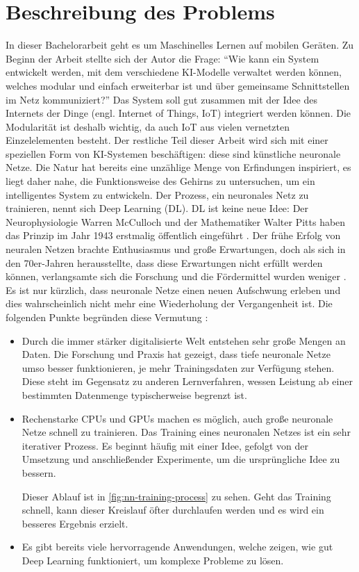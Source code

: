 \section{Beschreibung des Problems}
In dieser Bachelorarbeit geht es um Maschinelles Lernen auf mobilen Geräten.
Zu Beginn der Arbeit stellte sich der Autor die Frage:
\enquote{Wie kann ein System entwickelt werden, mit dem verschiedene KI-Modelle
  verwaltet werden können, welches modular und einfach erweiterbar ist
  und über gemeinsame Schnittstellen im Netz kommuniziert?}
Das System soll gut zusammen mit der Idee des Internets der Dinge
(engl. Internet of Things, IoT) integriert werden können.
Die Modularität ist deshalb wichtig, da auch IoT aus vielen vernetzten
Einzelelementen besteht.
Der restliche Teil dieser Arbeit wird sich mit einer
speziellen Form von KI-Systemen beschäftigen: diese sind künstliche
neuronale Netze. Die Natur hat bereits eine unzählige Menge von Erfindungen
inspiriert, es liegt daher nahe, die Funktionsweise des Gehirns zu
untersuchen, um ein intelligentes System zu entwickeln.
Der Prozess, ein neuronales Netz zu trainieren, nennt sich Deep Learning (DL).
DL ist keine neue Idee:
Der Neurophysiologie Warren McCulloch und der Mathematiker Walter Pitts
haben das Prinzip im Jahr 1943 erstmalig öffentlich eingeführt
\parencite[280]{book:hands-on-ml}. Der frühe Erfolg von neuralen
Netzen brachte Enthusiasmus und große Erwartungen,
doch als sich in den 70er-Jahren herausstellte, dass diese Erwartungen nicht erfüllt
werden können, verlangsamte sich die Forschung und die Fördermittel
wurden weniger \parencite[280]{book:hands-on-ml}.
Es ist nur kürzlich, dass neuronale Netze einen neuen Aufschwung erleben
und dies wahrscheinlich nicht mehr eine Wiederholung der Vergangenheit ist.
Die folgenden Punkte begründen diese Vermutung \parencite[280]{book:hands-on-ml}:
\begin{itemize}
  \item Durch die immer stärker digitalisierte Welt
        entstehen sehr große Mengen an Daten.
        Die Forschung und Praxis hat gezeigt, dass tiefe neuronale Netze umso besser funktionieren,
        je mehr Trainingsdaten zur Verfügung stehen. Diese steht im Gegensatz
        zu anderen Lernverfahren, wessen Leistung ab einer bestimmten
        Datenmenge typischerweise begrenzt ist.
  \item Rechenstarke CPUs und GPUs machen es möglich, auch große neuronale Netze
        schnell zu trainieren. Das Training eines neuronalen
        Netzes ist ein sehr iterativer Prozess.
        Es beginnt häufig mit einer Idee,
        gefolgt von der Umsetzung und anschließender Experimente, um die ursprüngliche
        Idee zu bessern.
        
        Dieser Ablauf ist in \autoref{fig:nn-training-process} zu sehen.
        Geht das Training schnell, kann dieser Kreislauf öfter durchlaufen
        werden und es wird ein besseres Ergebnis erzielt.
  \item Es gibt bereits viele hervorragende Anwendungen, welche zeigen,
        wie gut Deep Learning funktioniert, um komplexe Probleme zu lösen.
\end{itemize}
